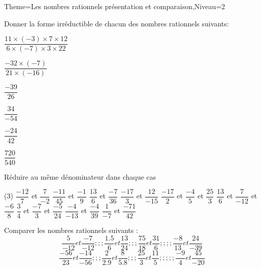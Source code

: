 \documentclass[a4paper,12pt]{article}
\begin{document}
\begin{Maquette}[Fiche]{Theme=Les nombres rationnels présentation et comparaison,Niveau=2}
\begin{exercice}
Donner la forme irréductible de chacun des nombres rationnels suivants:\vspace{0.5cm}\newline
\begin{itemize*}
\item $\dfrac{11\times (-3)\times 7\times 12}{6\times (-7) \times 3 \times 22}$
\item $\dfrac{-32\times (-7)}{21\times (-16)}$
\item $\dfrac{-39}{26}$
\item $\dfrac{34}{-54}$
\item $\dfrac{-24}{42}$
\item $\dfrac{720}{540} $
\end{itemize*}
\end{exercice}
\begin{exercice}
Réduire au même dénominateur dans chaque cas 
\begin{tasks}(3)
\task $\dfrac{-12}{7}$ et $\dfrac{7}{-2}$
\task $\dfrac{-11}{45}$ et $\dfrac{-1}{9}$
\task $\dfrac{13}{6}$ et $\dfrac{-7}{36}$
\task $\dfrac{-17}{3}$ et $\dfrac{12}{-15}$
\task $\dfrac{-17}{2}$ et $\dfrac{-4}{5}$ et $\dfrac{25}{3}$
\task $\dfrac{13}{6}$ et $\dfrac{7}{-12}$ et $\dfrac{-6}{8} $
\task $\dfrac{3}{4}$ et $\dfrac{-7}{3}$ et $\dfrac{-5}{24}$
\task $\dfrac{-4}{-13}$ et $\dfrac{-4}{39}$
\task $\dfrac{1}{-7}$ et $\dfrac{-71}{42}$
\end{tasks}
\end{exercice}
\begin{exercice}
Comparer les nombres rationnels suivants :
$$\dfrac{5}{-12}et\dfrac{-7}{-12};;;\dfrac{1.5}{6}et\dfrac{13}{24};;;\dfrac{75}{18}et\dfrac{31}{6};;;;\dfrac{-8}{13}et\dfrac{24}{-39} $$
$$\dfrac{-56}{23}et\dfrac{-14}{-56};;;\dfrac{2}{2.9}et\dfrac{8}{5.8};;;\dfrac{25}{3}et\dfrac{11}{5};;;;;\dfrac{-9}{4}et\dfrac{45}{-20} $$

\end{exercice}

\end{Maquette}
\end{document}
